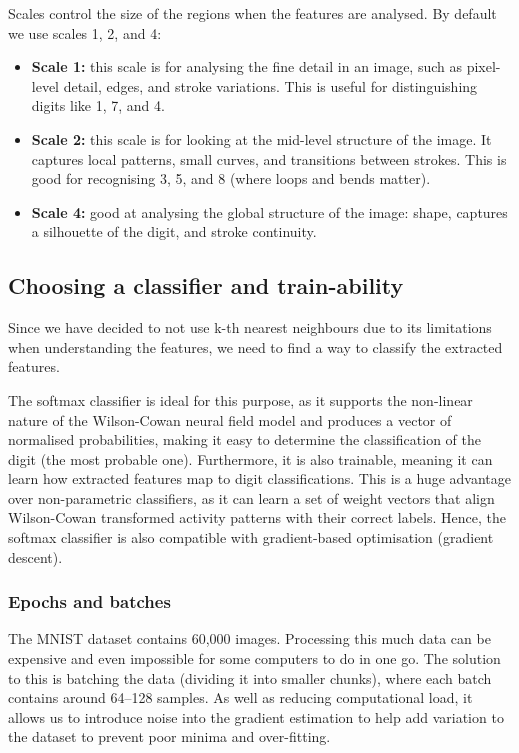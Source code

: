 \documentclass[10pt]{article}
\begin{document}
\begin{flushleft}
    Scales control the size of the regions when the features are analysed.
    By default we use scales 1, 2, and 4:

    \begin{itemize}
        \item \textbf{Scale 1:} this scale is for analysing the fine detail in an image, such as
        pixel-level detail, edges, and stroke variations.
        This is useful for distinguishing digits like 1, 7, and 4.
        \item \textbf{Scale 2:} this scale is for looking at the mid-level structure of the image.
        It captures local patterns, small curves, and transitions between strokes.
        This is good for recognising 3, 5, and 8 (where loops and bends matter).
        \item \textbf{Scale 4:} good at analysing the global structure of the image: shape, captures a silhouette of
        the digit, and stroke continuity.
    \end{itemize}

    \subsection{Choosing a classifier and train-ability}

    Since we have decided to not use k-th nearest neighbours due to its limitations when understanding the features,
    we need to find a way to classify the extracted features.

    
    The softmax classifier is ideal for this purpose, as it supports the non-linear nature of the Wilson-Cowan neural
    field model and produces a vector of normalised probabilities, making it easy to determine the
    classification of the digit (the most probable one).
    Furthermore, it is also trainable, meaning it can learn how extracted features map to digit classifications.
    This is a huge advantage over non-parametric classifiers, as it can learn a set of weight vectors that align
    Wilson-Cowan transformed activity patterns with their correct labels.
    Hence, the softmax classifier is also compatible with gradient-based optimisation (gradient descent).
    
    \subsubsection{Epochs and batches}

    The MNIST dataset contains 60,000 images.
    Processing this much data can be expensive and even impossible for some computers to do in one go.
    The solution to this is batching the data (dividing it into smaller chunks), where each batch
    contains around 64--128 samples.
    As well as reducing computational load, it allows us to introduce noise into the gradient
    estimation to help add variation to the dataset to prevent poor minima and over-fitting.


\end{flushleft}
\end{document}
